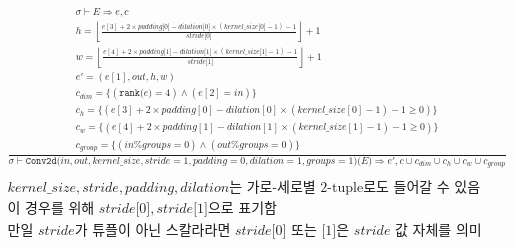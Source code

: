 \documentclass{article}
\newcommand{\x}{\times}
\newcommand{\rem}{\mtt{\%}}
\newcommand{\Rar}{\Rightarrow}
\newcommand{\mtt}[1]{\mathtt{#1}}
\newcommand{\op}[2]{\mtt{#1(}#2\mtt{)}}
\newcommand{\module}[3]{\mtt{#1(}#2\mtt{)(}#3\mtt{)}}
\newcommand{\ind}[1]{\mtt{[}#1\mtt{]}}
\begin{document}
\begin{align*}
  \frac
  {
    \begin{array}{l}
      \sigma \vdash E \Rar e, c \\
      h = \left\lfloor \frac{e[3] + 2 \x padding \ind{0} - dilation \ind{0}
        \x (kernel\_size \ind{0} - 1) - 1}{stride \ind{0}} \right\rfloor + 1 \\
      w = \left\lfloor \frac{e[4] + 2 \x padding \ind{1} - dilation \ind{1}
        \x (kernel\_size \ind{1} - 1) - 1}{stride \ind{1}} \right\rfloor + 1 \\
      e' = (e[1], out, h, w) \\
      c_{dim} = \{ (\op{rank}{e} = 4) \land (e[2] = in) \} \\
      c_h = \{ (e[3] + 2 \x padding[0] - dilation[0] \x (kernel\_size[0] - 1) -
      1 \geq 0) \}\\
      c_w = \{ (e[4] + 2 \x padding[1] - dilation[1] \x (kernel\_size[1] - 1) -
      1 \geq 0) \}\\
      c_{group} = \{ (in \rem groups = 0) \land (out \rem groups = 0) \}
    \end{array}
  }
  {
    \sigma \vdash \module{Conv2d}{in, out, kernel\_size, stride=1, padding=0,
      dilation=1, groups=1}{E} \Rar e', c \cup c_{dim} \cup c_h \cup c_w \cup
      c_{group}
  } \\
  \\
  \text{$kernel\_size, stride, padding, dilation$는 가로-세로별 2-tuple로도 들어갈
  수 있음} \\
  \text{이 경우를 위해 $stride\ind{0}, stride\ind{1}$으로 표기함} \\
  \text{만일 $stride$가 튜플이 아닌 스칼라라면 $stride\ind{0}$ 또는 $\ind{1}$은
    $stride$ 값 자체를 의미}
\end{align*}
\end{document}
